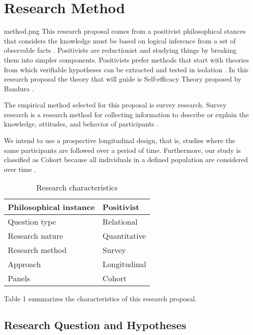 \documentclass{TheMartianReport}
\begin{document}
\section{Research Method}{method.png}
This research proposal comes from a positivist philosophical stances that considers the knowledge must be based on logical inference from a set of observable facts \cite{easterbrook2008selecting}. Positivists are reductionist and studying things by breaking them into simpler components. Positivists prefer methods that start with theories from which verifiable hypotheses can be extracted and tested in isolation \cite{easterbrook2008selecting}. In this research proposal the theory that will guide is Self-efficacy Theory  proposed by Bandura \cite{bandura1977self}.

The empirical method selected for this proposal is survey research. Survey research is a research method for collecting information to describe or explain the knowledge, attitudes, and behavior of participants \cite{easterbrook2008selecting}. 

We intend to use a prospective longitudinal design, that is, studies where the same participants are followed over a period of time. Furthermore, our study is classified as Cohort because all individuals in a defined population are considered over time \cite{caruana2015longitudinal}.


\begin{table}[h]
\centering
\caption{Research characteristics}
\begin{tabular}{ll}
\hline
Philosophical instance & Positivist   \\ \hline
Question type          & Relational \\ \hline
Research nature        & Quantitative \\ \hline
Research method        & Survey       \\ \hline
Approach               & Longitudinal   \\ \hline
Panels                 & Cohort   \\ \hline
\end{tabular}
\end{table}

Table 1 summarizes the characteristics of this research proposal.

\subsection{Research Question and Hypotheses }
\end{document}
